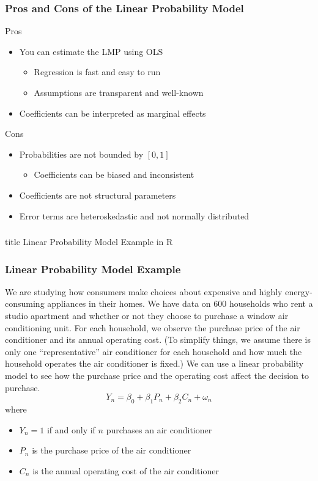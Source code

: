\documentclass{beamer}\usepackage[]{graphicx}\usepackage[]{color}
\begin{document}
\begin{frame}\frametitle{Pros and Cons of the Linear Probability Model}
    Pros
    \begin{itemize}
    	\item You can estimate the LMP using OLS
    	\begin{itemize}
    		\item Regression is fast and easy to run
    		\item Assumptions are transparent and well-known
    	\end{itemize}
    	\item Coefficients can be interpreted as marginal effects
    \end{itemize}
    \vspace{3ex}
    Cons
    \begin{itemize}
    	\item Probabilities are not bounded by $[0, 1]$
    	\begin{itemize}
    		\item Coefficients can be biased and inconsistent
    	\end{itemize}
    	\item Coefficients are not structural parameters
    	\item Error terms are heteroskedastic and not normally distributed
    \end{itemize}
\end{frame}

\begin{frame}\frametitle{}
    \vfill
    \centering
    \begin{beamercolorbox}[center]{title}
        \Large Linear Probability Model Example in R
    \end{beamercolorbox}
    \vfill
\end{frame}

\begin{frame}\frametitle{Linear Probability Model Example}
    We are studying how consumers make choices about expensive and highly energy-consuming appliances in their homes. We have data on 600 households who rent a studio apartment and whether or not they choose to purchase a window air conditioning unit. For each household, we observe the purchase price of the air conditioner and its annual operating cost. (To simplify things, we assume there is only one ``representative'' air conditioner for each household and how much the household operates the air conditioner is fixed.) We can use a linear probability model to see how the purchase price and the operating cost affect the decision to purchase.
    $$Y_n = \beta_0 + \beta_1 P_n + \beta_2 C_n + \omega_n$$
    where
    \begin{itemize}
    	\item $Y_n = 1$ if and only if $n$ purchases an air conditioner
    	\item $P_n$ is the purchase price of the air conditioner
    	\item $C_n$ is the annual operating cost of the air conditioner
    \end{itemize}
\end{frame}
\end{document}
